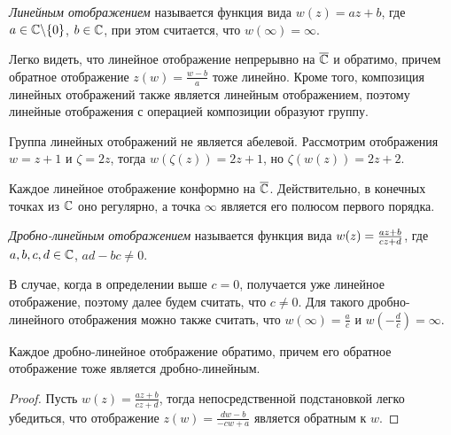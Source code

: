 \begin{definition}
	\textit{Линейным отображением} называется функция вида $w(z) = az + b$, где $a \in \mathbb{C} \backslash \{0\}$, $b \in \mathbb{C}$, при этом считается, что $w(\infty) = \infty$.
\end{definition}

\begin{unnecessary}

\begin{note}
	Легко видеть, что линейное отображение непрерывно на $\overline{\mathbb{C}}$ и обратимо, причем обратное отображение $z(w) = \frac{w - b}{a}$ тоже линейно. Кроме того, композиция линейных отображений также является линейным отображением, поэтому линейные отображения с операцией композиции образуют группу.
\end{note}

\begin{example}
	Группа линейных отображений не является абелевой. Рассмотрим отображения $w = z + 1$ и $\zeta = 2z$, тогда $w(\zeta(z)) = 2z + 1$, но $\zeta(w(z)) = 2z + 2$.
\end{example}

\end{unnecessary}

\begin{note}
	Каждое линейное отображение конформно на $\overline{\mathbb{C}}$. Действительно, в конечных точках из $\mathbb{C}$ оно регулярно, а точка $\infty$ является его полюсом первого порядка.
\end{note}

\begin{definition}
	\textit{Дробно-линейным отображением} называется функция вида $w(z) \hm= \frac{az + b}{cz + d}$, где $a, b, c, d \in \mathbb{C}$, $ad - bc \ne 0$.
\end{definition}

\begin{note}
	В случае, когда в определении выше $c = 0$, получается уже линейное отображение, поэтому далее будем считать, что $c \ne 0$. Для такого дробно-линейного отображения можно также считать, что $w(\infty) = \frac ac$ и $w(-\frac dc) = \infty$.
\end{note}

\begin{proposition}
	Каждое дробно-линейное отображение обратимо, причем его обратное отображение тоже является дробно-линейным.
\end{proposition}

\begin{proof}
	Пусть $w(z) = \frac{az + b}{cz + d}$, тогда непосредственной подстановкой легко убедиться, что отображение $z(w) = \frac{dw - b}{-cw + a}$ является обратным к $w$.
\end{proof}

